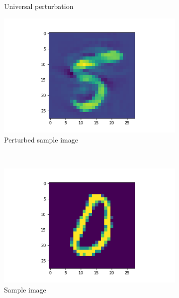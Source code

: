 \begin{figure}[!h]
\begin{subfigure}[c]{0.3\textwidth}
    \caption{Universal perturbation}
    \label{subfig:my_label2}
    \end{subfigure}
    \begin{subfigure}[c]{0.3\textwidth}
    \includegraphics[width=\textwidth]{attack_perturbed_image.png}
    \caption{Perturbed sample image}
    \label{subfig:my_label3}
    \end{subfigure}\\
    \begin{subfigure}[c]{0.3\textwidth}
    \includegraphics[width=\textwidth]{attack_defence_image.png}
    \caption{Sample image}
    \label{subfig:my_label4}
    \end{subfigure}
    \begin{subfigure}[c]{0.3\textwidth}

\end{subfigure}
\end{figure}
